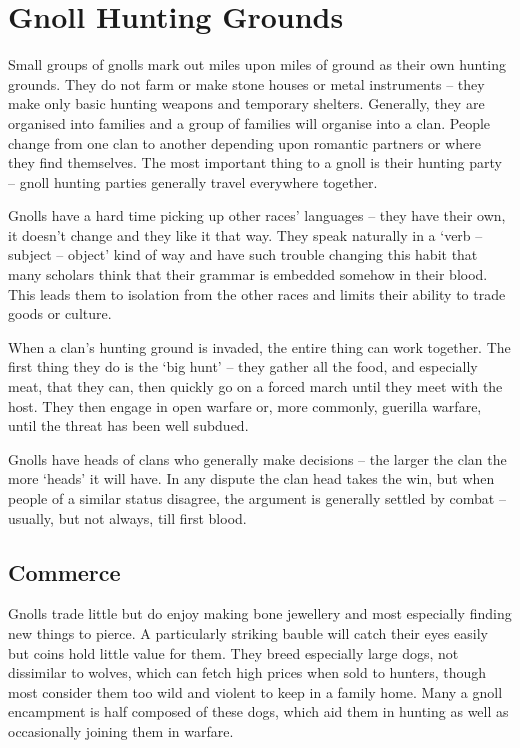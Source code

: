 \section[Gnolls]{Gnoll Hunting Grounds \Nl}

\begin{multicols}{2}

\noindent
Small groups of gnolls mark out miles upon miles of ground as their own hunting grounds.
They do not farm or make stone houses or metal instruments -- they make only basic hunting weapons and temporary shelters.
Generally, they are organised into families and a group of families will organise into a clan.
People change from one clan to another depending upon romantic partners or where they find themselves.
The most important thing to a gnoll is their hunting party -- gnoll hunting parties generally travel everywhere together.

Gnolls have a hard time picking up other races' languages -- they have their own, it doesn't change and they like it that way.
They speak naturally in a `verb -- subject -- object' kind of way and have such trouble changing this habit that many scholars think that their grammar is embedded somehow in their blood.
This leads them to isolation from the other races and limits their ability to trade goods or culture.

When a clan's hunting ground is invaded, the entire thing can work together.
The first thing they do is the `big hunt' -- they gather all the food, and especially meat, that they can, then quickly go on a forced march until they meet with the host.
They then engage in open warfare or, more commonly, guerilla warfare, until the threat has been well subdued.

Gnolls have heads of clans who generally make decisions -- the larger the clan the more `heads' it will have.
In any dispute the clan head takes the win, but when people of a similar status disagree, the argument is generally settled by combat -- usually, but not always, till first blood.

\subsection{Commerce}

Gnolls trade little but do enjoy making bone jewellery and most especially finding new things to pierce.
A particularly striking bauble will catch their eyes easily but coins hold little value for them.
They breed especially large dogs, not dissimilar to wolves, which can fetch high prices when sold to hunters, though most consider them too wild and violent to keep in a family home.
Many a gnoll encampment is half composed of these dogs, which aid them in hunting as well as occasionally joining them in warfare.


\end{multicols}
